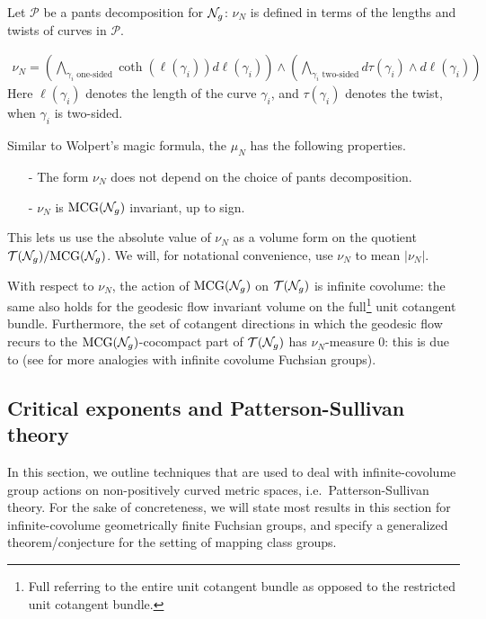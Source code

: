Let $\mathcal{P}$ be a pants decomposition for $\mathcal{N}_g$: $\nu_N$ is defined in terms of the lengths and twists of curves in $\mathcal{P}$.

\begin{align*}
  \nu_N = \left( \bigwedge_{\text{$\gamma_i$ one-sided}} \coth(\ell(\gamma_i)) d\ell(\gamma_i) \right) \wedge \left( \bigwedge_{\text{$\gamma_i$ two-sided}} d\tau(\gamma_i) \wedge d\ell(\gamma_i) \right)
\end{align*}
Here $\ell(\gamma_i)$ denotes the length of the curve $\gamma_i$, and $\tau(\gamma_i)$ denotes the twist, when $\gamma_i$ is two-sided.

Similar to Wolpert's magic formula, the $\mu_N$ has the following properties.
\begin{itemize}
\item[-] The form $\nu_N$ does not depend on the choice of pants decomposition.
\item[-] $\nu_N$ is $\mathrm{MCG}(\mathcal{N}_g)$ invariant, up to sign.
\end{itemize}
This lets us use the absolute value of $\nu_N$ as a volume form on the quotient $\mathcal{T}(\mathcal{N}_g) / \mathrm{MCG}(\mathcal{N}_g)$.
We will, for notational convenience, use $\nu_N$ to mean $\left| \nu_N \right|$.

With respect to $\nu_N$, the action of $\mathrm{MCG}(\mathcal{N}_g)$ on $\mathcal{T}(\mathcal{N}_g)$ is infinite covolume: the same also holds for the geodesic flow invariant volume on the full\footnote{Full referring to the entire unit cotangent bundle as opposed to the restricted unit cotangent bundle.} unit cotangent bundle.
Furthermore, the set of cotangent directions in which the geodesic flow recurs to the $\mathrm{MCG}(\mathcal{N}_g)$-cocompact part of $\mathcal{T}(\mathcal{N}_g)$ has $\nu_N$-measure $0$: this is due to \textcite{norbury2008lengths} (see \textcite{gendulphe2017whats} for more analogies with infinite covolume Fuchsian groups).

\subsection{Critical exponents and Patterson-Sullivan theory}
\label{sec:crit-expon-patt}

In this section, we outline techniques that are used to deal with infinite-covolume group actions on non-positively curved metric spaces, i.e.\ Patterson-Sullivan theory.
For the sake of concreteness, we will state most results in this section for infinite-covolume geometrically finite Fuchsian groups, and specify a generalized theorem/conjecture for the setting of mapping class groups.


